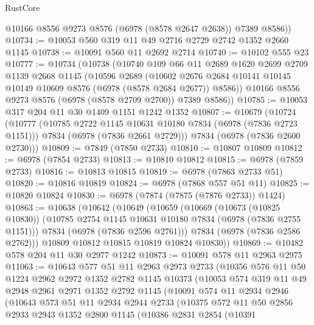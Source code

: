 \begin{lexlean}{RustCore}
\begin{coremodule}
        @10166
        @8556
        @9273
        @8576
        (@6978 (@8578 @2647 @2638))
        @7389
        @8586))
@10734 := @10053 @560 @319 @11 @49 @2716 @2729 @2742 @1352 @2660 @1145
@10738 := @10091 @560 @11 @2692 @2714
@10740 := @10102 @555 @23
@10777 := @10734
    (@10738
      (@10740
        @109
        @66
        @11
        @2689
        @1620
        @2699
        @2709
        @1139
        @2668
        @1145
        (@10596
          @2689
          (@10602 @2676 @2684 @10141 @10145 @10149 @10609 @8576 (@6978 (@8578 @2684 @2677)) @8586))
        @10166
        @8556
        @9273
        @8576
        (@6978 (@8578 @2709 @2700))
        @7389
        @8586))
@10785 := @10053 @317 @204 @11 @30 @1409 @1151 @1242 @1352
@10807 := @10679
    (@10724
      (@10777
        (@10785 @2722 @1145 @10631 @10180 @7834 (@6978 (@7836 @2723 @1151)))
        @7834
        (@6978 (@7836 @2661 @2729)))
      @7834
      (@6978 (@7836 @2600 @2730)))
@10809 := @7849 (@7850 @2733)
@10810 := @10807 @10809
@10812 := @6978 (@7854 @2733)
@10813 := @10810 @10812
@10815 := @6978 (@7859 @2733)
@10816 := @10813 @10815
@10819 := @6978 (@7863 @2733 @51)
@10820 := @10816 @10819
@10824 := @6978 (@7868 @557 @51 @11)
@10825 := @10820 @10824
@10830 := @6978 (@7874 (@7875 (@7876 @2733)) @1424)
@10863 := @10638
    (@10642
      (@10649
        (@10659
          (@10669
            (@10673 (@10825 @10830))
            (@10785 @2754 @1145 @10631 @10180 @7834 (@6978 (@7836 @2755 @1151)))
            @7834
            (@6978 (@7836 @2596 @2761)))
          @7834
          (@6978 (@7836 @2586 @2762)))
        @10809
        @10812
        @10815
        @10819
        @10824
        @10830))
@10869 := @10482 @578 @204 @11 @30 @2977 @1242
@10873 := @10091 @578 @11 @2963 @2975
@11063 := @10643
    @577
    @51
    @11
    @2963
    @2973
    @2733
    (@10356
      @576
      @11
      @50
      @1224
      @2962
      @2972
      @1352
      @2782
      @1145
      @10373
      (@10053
        @574
        @319
        @11
        @49
        @2948
        @2961
        @2971
        @1352
        @2792
        @1145
        (@10091
          @574
          @11
          @2934
          @2946
          (@10643
            @573
            @51
            @11
            @2934
            @2944
            @2733
            (@10375
              @572
              @11
              @50
              @2856
              @2933
              @2943
              @1352
              @2800
              @1145
              (@10386
                @2831
                @2854
                (@10391

\end{coremodule}
\end{lexlean}
